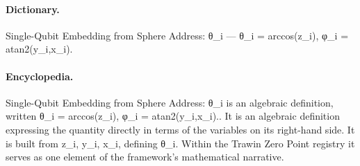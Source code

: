\paragraph{Dictionary.}
Single-Qubit Embedding from Sphere Address: θ\_i — θ\_i = arccos(z\_i), φ\_i = atan2(y\_i,x\_i).

\paragraph{Encyclopedia.}
Single-Qubit Embedding from Sphere Address: θ\_i is an algebraic definition, written θ\_i = arccos(z\_i), φ\_i = atan2(y\_i,x\_i).. It is an algebraic definition expressing the quantity directly in terms of the variables on its right-hand side. It is built from z\_i, y\_i, x\_i, defining θ\_i. Within the Trawin Zero Point registry it serves as one element of the framework's mathematical narrative.
